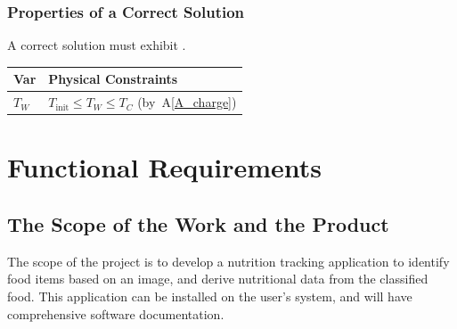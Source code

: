 \documentclass[12pt]{article}
\newcommand{\aref}[1]{A\ref{#1}}
\begin{document}
{\subsubsection{Properties of a Correct Solution} \label{sec_CorrectSolution}

\noindent
A correct solution must exhibit .  

\begin{table}[!h]
\caption{Output Variables} \label{TblOutputVar}
\renewcommand{\arraystretch}{1.2}
\noindent \begin{longtable*}{l l} 
  \toprule
  \textbf{Var} & \textbf{Physical Constraints} \\
  \midrule 
  $T_W$ & $T_\text{init} \leq T_W \leq T_C$ (by~\aref{A_charge})
  \\
  \bottomrule
\end{longtable*}
\end{table}


\section{Functional Requirements}

\subsection{The Scope of the Work and the Product}

The scope of the project is to develop a nutrition tracking application to identify food items based on an image, and derive nutritional data from the classified food. This application can be installed on the user's system, and will have comprehensive software documentation.

}
\end{document}
